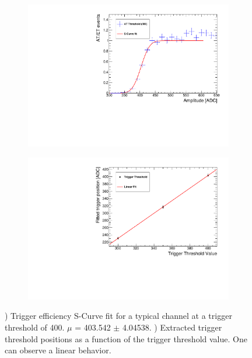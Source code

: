\begin{figure}[htbp!]
  \centering
  \begin{subfigure}[t]{0.49\textwidth}
    \includegraphics[width=1.\linewidth]{../Thesis_Plots/Commissioning/Plots/EfficiencyCurveFit_HBU2_12.pdf}
    \caption{} \label{fig:EffiCurve}
  \end{subfigure}
  \hfill
  \begin{subfigure}[t]{0.49\textwidth}
    \includegraphics[width=1.\linewidth]{../Thesis_Plots/Commissioning/Plots/TriggerThresholdFit_HBU2_12.pdf}
    \caption{} \label{fig:TriggerFit}
  \end{subfigure}
  \caption{) Trigger efficiency S-Curve fit for a typical channel at a trigger threshold of 400. $\mu$ = 403.542 $\pm$ 4.04538. ) Extracted trigger threshold positions as a function of the trigger threshold value. One can observe a linear behavior.}
\end{figure}

